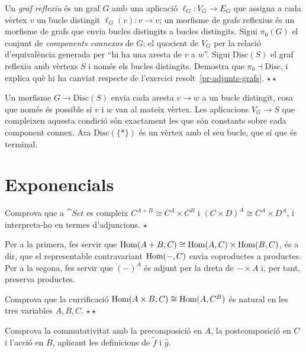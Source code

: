 \begin{exercici}
Un \emph{graf reflexiu} és un graf $G$ amb una aplicació $\ell_G\colon V_G\to E_G$ que assigna a cada vèrtex $v$ un bucle distingit $\ell_G(v)\colon v\to v$; un morfisme de grafs reflexius és un morfisme de grafs que envia bucles distingits a bucles distingits. Sigui $\pi_0(G)$ el conjunt de \emph{components connexos} de $G$: el quocient de $V_G$ per la relació d'equivalència generada per \enquote{hi ha una aresta de $v$ a $w$}. Sigui $\mathrm{Disc}(S)$ el graf reflexiu amb vèrtexs $S$ i només els bucles distingits. Demostra que $\pi_0\dashv\mathrm{Disc}$, i explica què hi ha canviat respecte de l'exercici resolt~\ref{pr-adjunts-grafs}. \hfill{\normalfont$\star\star$}
\begin{indicacio}
Un morfisme $G\to\mathrm{Disc}(S)$ envia cada aresta $v\to w$ a un bucle distingit, cosa que només és possible si $v$ i $w$ van al mateix vèrtex. Les aplicacions $V_G\to S$ que compleixen aquesta condició són exactament les que són constants sobre cada component connex. Ara $\mathrm{Disc}(\{\ast\})$ és un vèrtex amb el seu bucle, que sí que és terminal.
\end{indicacio}
\end{exercici}

\section{Exponencials}

\begin{exercici}
Comprova que a $\cat{Set}$ es compleix $C^{A+B}\cong C^A\times C^B$ i $(C\times D)^A\cong C^A\times D^A$, i interpreta-ho en termes d'adjuncions. \hfill{\normalfont$\star$}
\begin{indicacio}
Per a la primera, fes servir que $\operatorname{Hom}(A+B,C)\cong\operatorname{Hom}(A,C)\times\operatorname{Hom}(B,C)$, és a dir, que el representable contravariant $\operatorname{Hom}(-,C)$ envia coproductes a productes. Per a la segona, fes servir que $(-)^A$ és adjunt per la dreta de $-\times A$ i, per tant, preserva productes.
\end{indicacio}
\end{exercici}

\begin{exercici}
Comprova que la currificació $\operatorname{Hom}(A\times B,C)\cong\operatorname{Hom}(A,C^B)$ és natural en les tres variables $A,B,C$. \hfill{\normalfont$\star\star$}
\begin{indicacio}
Comprova la commutativitat amb la precomposició en $A$, la postcomposició en $C$ i l'acció en $B$, aplicant les definicions de $\tilde f$ i $\hat g$.
\end{indicacio}
\end{exercici}
